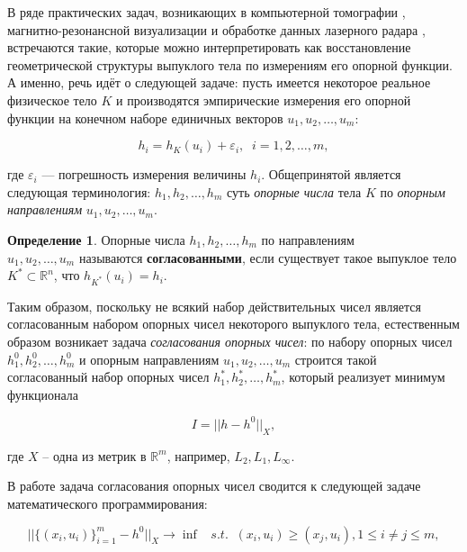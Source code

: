 \documentclass[a4paper, 10pt]{article}
\theoremstyle{definition}
\newtheorem{SmartDefinition}{Определение}
\theoremstyle{plain}
\theoremstyle{plain}
\begin{document}
В ряде практических задач, возникающих в компьютерной томографии
\cite{PrinceWillsky}, магнитно-резонансной визуализации
\cite{GregorRannou2001, GregorRannou2002} и обработке данных лазерного радара
\cite{LeleKulkarniWillsky}, встречаются такие, которые можно интерпретировать
как восстановление геометрической структуры выпуклого тела по измерениям его
опорной функции. А именно, речь идёт о следующей задаче: пусть имеется
некоторое реальное физическое тело $K$ и производятся эмпирические измерения
его опорной функции на конечном наборе единичных векторов
$u_{1}, u_{2}, \ldots, u_{m}$:

\begin{equation*}
 h_{i} = h_{K}(u_{i}) + \varepsilon_{i}, \;\; i = 1, 2, \ldots, m,
\end{equation*}

где $\varepsilon_{i}$ --- погрешность измерения величины $h_{i}$. Общепринятой
является следующая терминология: $h_{1}, h_{2}, \ldots, h_{m}$ суть
\textit{опорные числа} тела $K$ по \textit{опорным направлениям}
$u_{1}, u_{2}, \ldots, u_{m}$.

\begin{SmartDefinition}
 \label{def:consistency}
 Опорные числа $h_{1}, h_{2}, \ldots, h_{m}$ по направлениям \\
 $u_{1}, u_{2}, \ldots, u_{m}$ называются \textbf{согласованными}, если
 существует такое выпуклое тело  $K^{*} \subset \mathbb{R}^{n}$, что
 $h_{K^{*}}(u_{i}) = h_{i}$.
\end{SmartDefinition}

Таким образом, поскольку не всякий набор действительных чисел является
согласованным набором опорных чисел некоторого выпуклого тела, естественным
образом возникает задача \textit{согласования опорных чисел}: по набору опорных
чисел $h^{0}_{1}, h^{0}_{2}, \ldots, h^{0}_{m}$ и опорным направлениям
$u_{1}, u_{2}, \ldots, u_{m}$ строится такой согласованный набор опорных чисел
$h^{*}_{1}, h^{*}_{2}, \ldots, h^{*}_{m}$, который реализует минимум функционала

\begin{equation*}
 I = || h - h^{0} ||_{X},
\end{equation*}

где $X$ -- одна из метрик  в $\mathbb{R}^{m}$, например,
$L_{2}, L_{1}, L_{\infty}$.

В работе \cite{GardnerKiderlen} задача согласования опорных чисел сводится к
следующей задаче математического программирования:

\begin{equation}
\label{equation:gardner-kiderlen}
 ||\{(x_{i}, u_{i})\}_{i = 1}^{m} - h^{0}||_{X} \to \inf \;\;\; s. t. \;\;
 (x_{i}, u_{i}) \geq (x_{j}, u_{i}), 1 \leq i \neq j \leq m,
\end{equation}
\end{document}
